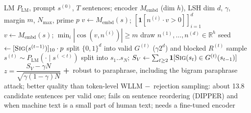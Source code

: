 \documentclass[10pt,a4paper,twocolumn]{article}
\newcommand{\pro}[1]{\Statex\textcolor{proc}{\textbf{+}\ #1}}
\newcommand{\con}[1]{\Statex\textcolor{conc}{\textbf{$-$}\ #1}}
\begin{document}
\begin{algorithm}[H]\small
\caption{SemStamp (Hou et al.\ 2023)}
\begin{algorithmic}[1]
\Require LM $P_{\mathrm{LM}}$, prompt $s^{(0)}$, $T$ sentences; encoder $M_{\mathrm{embd}}$ (dim $h$), LSH dim $d$, $\gamma$, margin $m$, $N_{\max}$, prime $p$
 \State $v\gets M_{\mathrm{embd}}(s)$; \Return $[\mathbf 1[n^{(i)}\!\cdot v>0]]_{i=1}^d$ \EndFunction
{} \State $v\gets M_{\mathrm{embd}}(s)$; \Return $\min_i|\cos(v,n^{(i)})|\ge m$ \EndFunction
{}
 \State draw $n^{(1)},\dots,n^{(d)}\in\mathbb R^h$ 
  \State seed $\gets[\textsc{Sig}(s^{(t-1)})]_{10}\cdot p$
  \State split $\{0,1\}^d$ into valid $G^{(t)}$ ($\gamma2^d$) and blocked $R^{(t)}$
  \Repeat
   \State sample $s^{(t)}\sim P_{\mathrm{LM}}(\cdot\mid s^{(<t)})$
 \EndFor
\EndProcedure
{}
 \State split into $s_1..s_N$; $S_V\gets\sum_{t\ge2}\mathbf 1[\textsc{Sig}(s_t)\in G^{(t)}(s_{t-1})]$
 \State \Return $z=\dfrac{S_V-\gamma N}{\sqrt{\gamma(1-\gamma)N}}$
\EndProcedure
\pro{robust to paraphrase, including the bigram paraphrase attack; better quality than token-level WLLM}
\con{rejection sampling: about 13.8 candidate sentences per valid one; fails on sentence reordering (DIPPER) and when machine text is a small part of human text; needs a fine-tuned encoder}
\end{algorithmic}
\end{algorithm}
\end{document}
